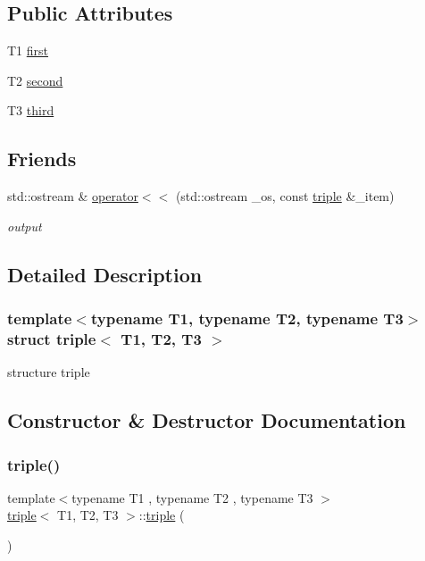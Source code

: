 \subsection*{Public Attributes}
\begin{DoxyCompactItemize}
\item 
T1 \hyperlink{structtriple_a6aa8508e6e6f859dda04f144f361c0d2}{first}
\item 
T2 \hyperlink{structtriple_a41050194c8c7984707c7ad13c96e8631}{second}
\item 
T3 \hyperlink{structtriple_a5675f08ea7996033edbcf7074404cdd8}{third}
\end{DoxyCompactItemize}
\subsection*{Friends}
\begin{DoxyCompactItemize}
\item 
std\+::ostream \& \hyperlink{structtriple_a213e2d21647f20d6287690438970f212}{operator$<$$<$} (std\+::ostream \+\_\+os, const \hyperlink{structtriple}{triple} \&\+\_\+item)
\begin{DoxyCompactList}\small\item\em output \end{DoxyCompactList}\end{DoxyCompactItemize}


\subsection{Detailed Description}
\subsubsection*{template$<$typename T1, typename T2, typename T3$>$\newline
struct triple$<$ T1, T2, T3 $>$}

structure triple 

\subsection{Constructor \& Destructor Documentation}
\mbox{\label{structtriple_a3bdf8136df773fff422b4cbb354cf749}} 
\subsubsection{\texorpdfstring{triple()}{triple()}\hspace{0.1cm}{\footnotesize\ttfamily [1/3]}}
{\footnotesize\ttfamily template$<$typename T1 , typename T2 , typename T3 $>$ \\
\hyperlink{structtriple}{triple}$<$ T1, T2, T3 $>$\+::\hyperlink{structtriple}{triple} (\begin{DoxyParamCaption}{ }\end{DoxyParamCaption})\hspace{0.3cm}{\ttfamily [inline]}}



